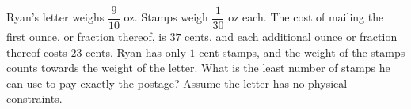 Ryan's letter weighs $\dfrac{9}{10}$ oz. Stamps weigh $\dfrac{1}{30}$ oz each. The cost of mailing the first ounce, or fraction thereof, is $37$ cents, and each additional ounce or fraction thereof costs $23$ cents. Ryan has only $1$-cent stamps, and the weight of the stamps counts towards the weight of the letter. What is the least number of stamps he can use to pay exactly the postage? Assume the letter has no physical constraints.
